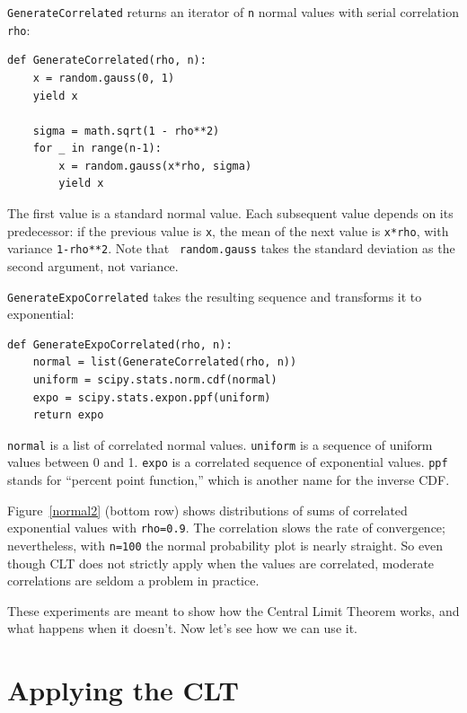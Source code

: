 \documentclass[12pt]{book}
\theoremstyle{exercise}
\begin{document}
{\tt GenerateCorrelated} returns an iterator of {\tt n} normal values
with serial correlation {\tt rho}:%

\begin{verbatim}
def GenerateCorrelated(rho, n):
    x = random.gauss(0, 1)
    yield x

    sigma = math.sqrt(1 - rho**2)
    for _ in range(n-1):
        x = random.gauss(x*rho, sigma)
        yield x
\end{verbatim}

The first value is a standard normal value.  Each subsequent value
depends on its predecessor: if the previous value is {\tt x}, the mean of
the next value is {\tt x*rho}, with variance {\tt 1-rho**2}.  Note that {\tt
  random.gauss} takes the standard deviation as the second argument,
not variance.%
%

{\tt GenerateExpoCorrelated}
takes the resulting sequence and transforms it to exponential:

\begin{verbatim}
def GenerateExpoCorrelated(rho, n):
    normal = list(GenerateCorrelated(rho, n))
    uniform = scipy.stats.norm.cdf(normal)
    expo = scipy.stats.expon.ppf(uniform)
    return expo
\end{verbatim}

{\tt normal} is a list of correlated normal values.  {\tt uniform}
is a sequence of uniform values between 0 and 1.  {\tt expo} is
a correlated sequence of exponential values.
{\tt ppf} stands for ``percent point function,'' which is another
name for the inverse CDF.%
%
%

Figure~\ref{normal2} (bottom row) shows distributions of sums of
correlated exponential values with {\tt rho=0.9}.  The correlation
slows the rate of convergence; nevertheless, with {\tt n=100} the
normal probability plot is nearly straight.  So even though CLT
does not strictly apply when the values are correlated, moderate
correlations are seldom a problem in practice.%
%

These experiments are meant to show how the Central Limit Theorem
works, and what happens when it doesn't.  Now let's see how we can
use it.


\section{Applying the CLT}%
\label{usingCLT}
\end{document}
